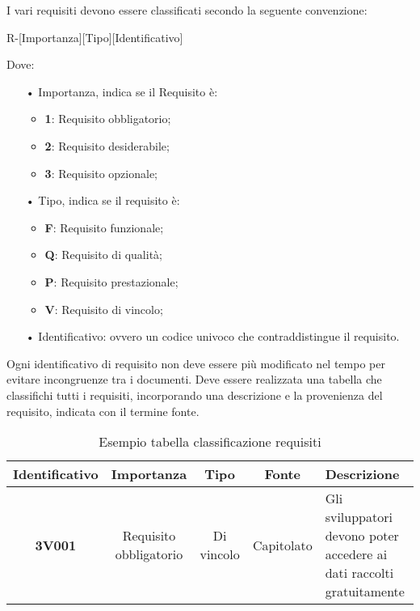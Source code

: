 I vari requisiti devono essere classificati secondo la seguente {convenzione}:
\begin{center}
R-[Importanza][Tipo][Identificativo]
\end{center}
Dove:
\begin{itemize}
\item[•] Importanza, indica se il Requisito è:
\begin{itemize}
\item \textbf{1}: Requisito obbligatorio;
\item \textbf{2}: Requisito desiderabile;
\item \textbf{3}: Requisito opzionale;
\end{itemize}
\item[•] Tipo, indica se il requisito è:
\begin{itemize}
\item \textbf{F}: Requisito funzionale;
\item \textbf{Q}: Requisito di qualità;
\item \textbf{P}: Requisito prestazionale;
\item \textbf{V}: Requisito di vincolo;
\end{itemize}
\item[•] Identificativo: ovvero un codice univoco che contraddistingue il requisito.
\end{itemize}
Ogni identificativo di requisito non deve essere più modificato nel tempo per evitare incongruenze tra i documenti.
Deve essere realizzata una tabella che classifichi tutti i requisiti, incorporando una descrizione e la provenienza del requisito, indicata con il termine fonte.
\begin{table}[H]
\centering
\begin{tabularx}{\linewidth}{| c | c | c | c | Z |}
\hline
\textbf{Identificativo} & \textbf{Importanza} & \textbf{Tipo} & \textbf{Fonte} & \textbf{Descrizione} \\
\hline
\textbf{3V001} & Requisito obbligatorio & Di vincolo & Capitolato & Gli sviluppatori devono poter accedere ai dati raccolti gratuitamente \\
\hline
\end{tabularx}
\caption{Esempio tabella classificazione requisiti}
\end{table}
